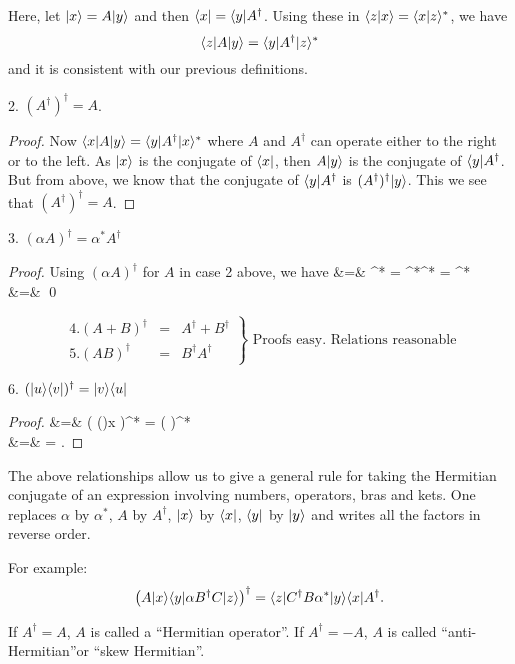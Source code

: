Here, let $|x\rangle = A|y\rangle$ and then $\langle x| = \langle y|A^\dagger$. Using these in $\langle z|x\rangle = \langle x|z\rangle^*$, we have 
$$\langle z| A| y \rangle = \langle y| A^\dagger| z \rangle^*$$ and it is consistent with our previous definitions. 

2. $(A^\dagger)^\dagger = A$. 
\begin{proof}
Now $\langle x| A| y \rangle = \langle y| A^\dagger| x \rangle^*$ where $A$ and $A^\dagger$ can operate either to the right or to the left. As $|x\rangle$ is the conjugate of $\langle x|$, then $A|y\rangle$ is the conjugate of $\langle y|A^\dagger$. But from above, 
we know that the conjugate of $\langle y|A^\dagger$ is $(A^\dagger)^\dagger|y\rangle$. This we see that $(A^\dagger)^\dagger = A$.
\end{proof}

3. $(\alpha A)^\dagger = \alpha^* A^\dagger$
\begin{proof}
Using $(\alpha A)^\dagger$ for $A$ in case 2 above, we have
\bearray
{} &=& ^* = \alpha^*^* = \alpha^*\\
&=&  \qed
\eearray\end{proof}

\[
\left.
\begin{array}{lcr}
4. (A+B)^\dagger &=  & A^\dagger + B^\dagger \\
5. (AB)^\dagger   &=  & B^\dagger A^\dagger
\end{array}
\right\} \mbox{ Proofs easy. Relations reasonable}
\]

6. $(|u\rangle\langle v|)^\dagger = |v\rangle\langle u|$
\begin{proof}
\bearray
{} &=& \left(  { ()}{x} \right)^* = \left(  \right)^* \\
&=&  = .
\eearray
\end{proof}

The above relationships allow us to give a general rule for taking the Hermitian conjugate of an expression  involving numbers, operators, bras and kets. One replaces $\alpha$ by $\alpha^*$, $A$ by $A^\dagger$, $|x\rangle$ by $\langle x|$,
$\langle y|$ by $|y\rangle$  and writes all the factors in reverse order. 

For example: $$\left( A|x\rangle \langle y| \alpha B^\dagger C| z \rangle\right)^\dagger = \langle z| C^\dagger B \alpha^*| y \rangle\langle x|A^\dagger.$$

If $A^\dagger = A$, $A$ is called a ``Hermitian operator''. If $A^\dagger = -A$, $A$ is called ``anti-Hermitian''or ``skew Hermitian''. 

